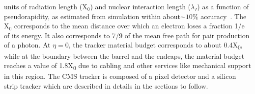 units of radiation length ($\mathrm{X_0}$) and nuclear interaction length ($\lambda_I$) as a function of pseudorapidity, as estimated from simulation 
within about$\sim10\%$ accuracy~\cite{Karimaki:368412,CMS:2010nua,Chatrchyan:2014fea}. The $\mathrm{X_0}$ corresponds to the mean distance over 
which an electron loses a fraction 1/e of its energy. It also corresponds to 7/9 of the mean free path for pair production of a photon. At $\eta=0$, 
the tracker material budget corresponds to about 0.4\unit{X_0}, while at the boundary between the barrel and the endcaps, the material budget reaches 
a value of 1.8\unit{X_0} due to cabling and other services like mechanical support in this region. The CMS tracker is composed of a pixel detector 
and a silicon strip tracker which are described in details in the sections to follow. 

